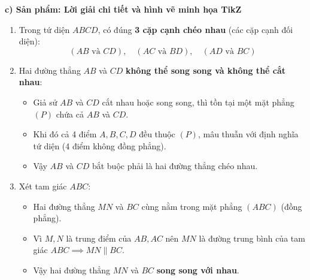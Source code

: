 \documentclass[12pt, a4paper]{article}
\begin{document}
\noindent \textbf{c) Sản phẩm: Lời giải chi tiết và hình vẽ minh họa TikZ}
\begin{center}
\end{center}
\begin{enumerate}[leftmargin=0.6cm]
    \item Trong tứ diện $ABCD$, có đúng \textbf{3 cặp cạnh chéo nhau} (các cặp cạnh đối diện):
    $$(AB \text{ và } CD), \quad (AC \text{ và } BD), \quad (AD \text{ và } BC)$$
    \item Hai đường thẳng $AB$ và $CD$ \textbf{không thể song song và không thể cắt nhau}:
    \begin{itemize}
        \item Giả sử $AB$ và $CD$ cắt nhau hoặc song song, thì tồn tại một mặt phẳng $(P)$ chứa cả $AB$ và $CD$.
        \item Khi đó cả 4 điểm $A, B, C, D$ đều thuộc $(P)$, mâu thuẫn với định nghĩa tứ diện (4 điểm không đồng phẳng).
        \item Vậy $AB$ và $CD$ bắt buộc phải là hai đường thẳng chéo nhau.
    \end{itemize}
    \item Xét tam giác $ABC$:
    \begin{itemize}
        \item Hai đường thẳng $MN$ và $BC$ cùng nằm trong mặt phẳng $(ABC)$ (đồng phẳng).
        \item Vì $M, N$ là trung điểm của $AB, AC$ nên $MN$ là đường trung bình của tam giác $ABC \implies MN \parallel BC$.
        \item Vậy hai đường thẳng $MN$ và $BC$ \textbf{song song với nhau}.
    \end{itemize}
\end{enumerate}
\end{document}
